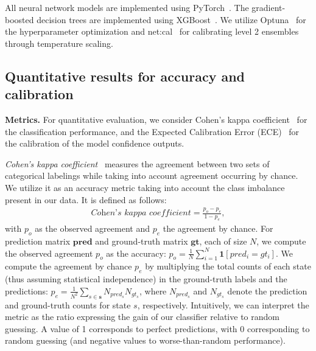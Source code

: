 All neural network models are implemented using PyTorch~\cite{paszke2019}. The gradient-boosted decision trees are implemented using XGBoost~\cite{xgboost2016}. We utilize Optuna~\cite{optuna2019} for the hyperparameter optimization and net:cal~\cite{kuppers2020} for calibrating level 2 ensembles through temperature scaling.



\subsection{Quantitative results for accuracy and calibration}\label{sec:metrics}
\textbf{Metrics.} For quantitative evaluation, we consider Cohen's kappa coefficient~\cite{cohen1960} for the classification performance, and the Expected Calibration Error (ECE)~\cite{degroot1983,naeini2015} for the calibration of the model confidence outputs. 

\textit{Cohen's kappa coefficient}~\cite{cohen1960} measures the agreement between two sets of categorical labelings while taking into account agreement occurring by chance. We utilize it as an accuracy metric taking into account the class imbalance present in our data. It is defined as follows:
\begin{align}
    \textit{Cohen's kappa coefficient} = \frac{p_o - p_e}{1 - p_e},
\end{align}
with $p_o$ as the observed agreement and $p_e$ the agreement by chance. For prediction matrix $\mathbf{pred}$ and ground-truth matrix $\mathbf{gt}$, each of size $N$, we compute the observed agreement $p_o$ as the accuracy: ${p_o = \frac{1}{N}\sum_{i=1}^N\mathbf{1}[pred_i = gt_i]}$. We compute the agreement by chance $p_e$ by multiplying the total counts of each state (thus assuming statistical independence) in the ground-truth labels and the predictions: ${p_e = \frac{1}{N^2} \sum_{s \in \mathbf{s}}N_{pred_s} N_{gt_s}}$, where $N_{pred_s}$ and $N_{gt_s}$ denote the prediction and ground-truth counts for state $s$, respectively. Intuitively, we can interpret the metric as the ratio expressing the gain of our classifier relative to random guessing. A value of 1 corresponds to perfect predictions, with 0 corresponding to random guessing (and negative values to worse-than-random performance).


